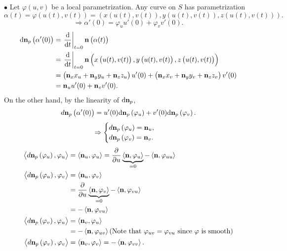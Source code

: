 \(\bullet\) Let \(\varphi(u,v)\) be a local parametrization. 
Any curve on \(S\) has parametrization
\[  
    \alpha(t)=\varphi\left(u(t),v(t)\right)=
    \left(x\left(u(t),v(t)\right),
        y\left(u(t),v(t)\right),
        z\left(u(t),v(t)\right)\right).
\]
\[\Rightarrow \alpha'(0)=\varphi_u u'(0)+\varphi_v v'(0).\]
\begin{align*}
    \dd \vb{n}_p\left(\alpha'(0)\right)
    &=\left.\dv{t}\right|_{t=0}\vb{n}\left(\alpha(t)\right)\\
    &=\left.\dv{t}\right|_{t=0}\vb{n}
    \left(x\left(u(t),v(t)\right),
        y\left(u(t),v(t)\right),
        z\left(u(t),v(t)\right)\right)\\
    &=\left(\vb{n}_x x_u+\vb{n}_y y_u+\vb{n}_z z_u\right)u'(0)
    +\left(\vb{n}_x x_v+\vb{n}_y y_v+\vb{n}_z z_v\right)v'(0)\\    
    &=\vb{n}_u u'(0)+\vb{n}_v v'(0).
\end{align*}
On the other hand, by the linearity of \(\dd \vb{n}_p\), 
\[
    d \vb{n}_p\left(\alpha'(0)\right)=u'(0)\dd \vb{n}_p
    \left(\varphi_u\right)+v'(0)\dd \vb{n}_p \left(\varphi_v\right).    
\]
\[
    \Rightarrow
    \begin{cases}
        d \vb{n}_p\left(\varphi_u\right)=\vb{n}_u,\\
        d \vb{n}_p\left(\varphi_v\right)=\vb{n}_v.
    \end{cases}
\]
\begin{align*}
    \left\langle d \vb{n}_p\left(\varphi_u\right),\varphi_u
    \right\rangle
    &=\left\langle\vb{n}_u,\varphi_u\right\rangle=
    \pdv{u}\underbrace{\left\langle\vb{n},\varphi_u\right\rangle}_{=0}
    -\left\langle\vb{n},\varphi_{uu}\right\rangle\\
    \left\langle d \vb{n}_p\left(\varphi_u\right),\varphi_v
    \right\rangle
    &=\left\langle\vb{n}_u,\varphi_v\right\rangle\\
    &=\pdv{u}\underbrace{\left\langle\vb{n},\varphi_v\right\rangle}_{=0}
    -\left\langle\vb{n},\varphi_{vu}\right\rangle\\
    &=-\left\langle\vb{n},\varphi_{vu}\right\rangle\\
    \left\langle d \vb{n}_p\left(\varphi_v\right),\varphi_u
    \right\rangle
    &=\left\langle\vb{n}_v,\varphi_u\right\rangle\\
    &=-\left\langle\vb{n},\varphi_{uv}\right\rangle
    (\text{Note that }\varphi_{uv}=\varphi_{vu}\text{ since }
    \varphi\text{ is smooth})\\
    \left\langle d \vb{n}_p\left(\varphi_v\right),\varphi_v
    \right\rangle
    &=\left\langle\vb{n}_v,\varphi_v\right\rangle
    =-\left\langle \vb{n}, \varphi_{vv}\right\rangle.
\end{align*}
